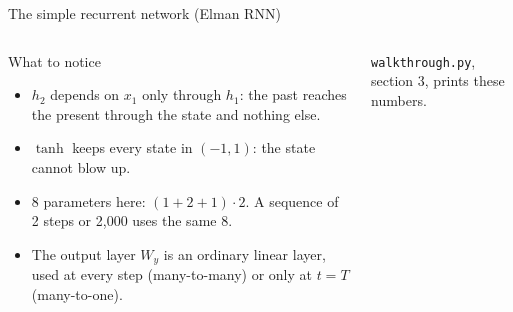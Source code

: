 \documentclass[aspectratio=169,10pt]{beamer}
\begin{document}
\begin{frame}{The simple recurrent network (Elman RNN)}
\begin{columns}[T,onlytextwidth]
\vspace{1mm}
\begin{block}{What to notice}
\footnotesize
\begin{itemize}
  \item $h_2$ depends on $x_1$ only through $h_1$: the past reaches the present through the state
        and nothing else.
  \item $\tanh$ keeps every state in $(-1,1)$: the state cannot blow up.
  \item 8 parameters here: $(1+2+1)\cdot2$. A sequence of 2 steps or 2{,}000 uses the same 8.
  \item The output layer $W_y$ is an ordinary linear layer, used at every step
        (many-to-many) or only at $t=T$ (many-to-one).
\end{itemize}
\end{block}
{\scriptsize\color{cTok}\texttt{walkthrough.py}, section 3, prints these numbers.\par}
\end{columns}
\end{frame}
\end{document}
